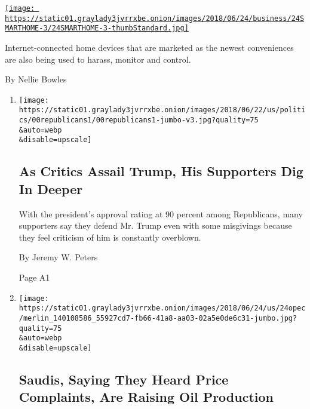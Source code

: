 \begin{enumerate}
\begin{enumerate}
    \href{/2018/06/23/technology/smart-home-devices-domestic-abuse.html}{\texttt{[image: https://static01.graylady3jvrrxbe.onion/images/2018/06/24/business/24SMARTHOME-3/24SMARTHOME-3-thumbStandard.jpg]}}

    Internet-connected home devices that are marketed as the newest
    conveniences are also being used to harass, monitor and control.

    By Nellie Bowles
  \end{enumerate}
\end{enumerate}

\begin{enumerate}
\def\labelenumi{\arabic{enumi}.}
\item
  \href{/2018/06/23/us/politics/republican-voters-trump.html}{}

  \texttt{[image: https://static01.graylady3jvrrxbe.onion/images/2018/06/22/us/politics/00republicans1/00republicans1-jumbo-v3.jpg?quality=75\\\&auto=webp\\\&disable=upscale]}

  \hypertarget{as-critics-assail-trump-his-supporters-dig-in-deeper}{%
  \subsection{As Critics Assail Trump, His Supporters Dig In
  Deeper}\label{as-critics-assail-trump-his-supporters-dig-in-deeper}}

  With the president's approval rating at 90 percent among Republicans,
  many supporters say they defend Mr. Trump even with some misgivings
  because they feel criticism of him is constantly overblown.

  By Jeremy W. Peters

  Page A1
\item
  \href{/2018/06/23/business/opec-oil-production.html}{}

  \texttt{[image: https://static01.graylady3jvrrxbe.onion/images/2018/06/24/us/24opec/merlin\_140108586\_55927cd7-fb66-41a8-aa03-02a5e0de6c31-jumbo.jpg?quality=75\\\&auto=webp\\\&disable=upscale]}

  \hypertarget{saudis-saying-they-heard-price-complaints-are-raising-oil-production}{%
  \subsection{Saudis, Saying They Heard Price Complaints, Are Raising
  Oil
  Production}\label{saudis-saying-they-heard-price-complaints-are-raising-oil-production}}


\end{enumerate}
